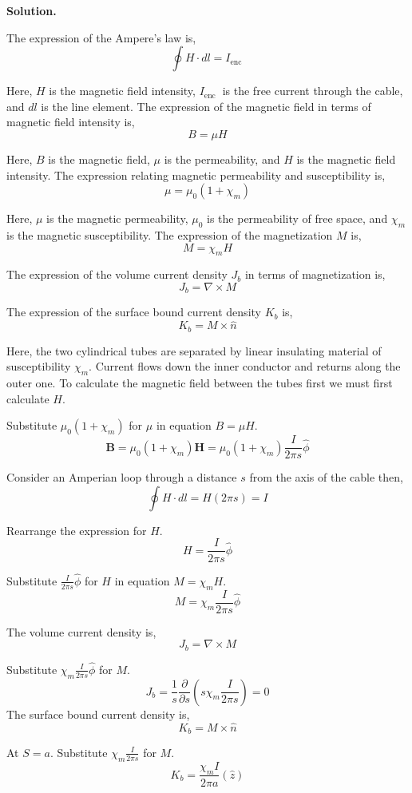 \documentclass[12pt, a4paper, oneside]{report}
\newenvironment{solution}{
  \par\medskip\noindent
  \textbf{Solution.}\quad\itshape
  \par\noindent\makebox[\linewidth]{\rule{\textwidth}{0.4pt}}
}{
  \par\noindent\makebox[\linewidth]{\rule{\textwidth}{0.4pt}}
  \par\medskip
}
\begin{document}
\begin{solution}
The expression of the Ampere's law is,
$$
\oint H \cdot d l=I_{\text {enc }}
$$

Here, $H$ is the magnetic field intensity, $I_{\text {enc }}$ is the free current through the cable, and $d l$ is the line element.
The expression of the magnetic field in terms of magnetic field intensity is,
$$
B=\mu H
$$

Here, $B$ is the magnetic field, $\mu$ is the permeability, and $H$ is the magnetic field intensity.
The expression relating magnetic permeability and susceptibility is,
$$
\mu=\mu_0\left(1+\chi_m\right)
$$

Here, $\mu$ is the magnetic permeability, $\mu_0$ is the permeability of free space, and $\chi_m$ is the magnetic susceptibility.
The expression of the magnetization $M$ is,
$$
M=\chi_m H
$$

The expression of the volume current density $J_b$ in terms of magnetization is,
$$
J_b=\nabla \times M
$$

The expression of the surface bound current density $K_b$ is,
$$
K_b=M \times \hat{n}
$$

Here, the two cylindrical tubes are separated by linear insulating material of susceptibility $\chi_m$. Current flows down the inner conductor and returns along the outer one. To calculate the magnetic field between the tubes first we must first calculate $H$.

Substitute $\mu_0\left(1+\chi_m\right)$ for $\mu$ in equation $B=\mu H$.
$$
\mathbf{B}  =\mu_0\left(1+\chi_m\right) \mathbf{H}  =\mu_0\left(1+\chi_m\right) \frac{I}{2 \pi s} \hat{\phi}
$$

Consider an Amperian loop through a distance $s$ from the axis of the cable then,
$$
\oint H \cdot d l  =H(2 \pi s) =I
$$

Rearrange the expression for $H$.
$$
H=\frac{I}{2 \pi s} \hat{\phi}
$$

Substitute $\frac{I}{2 \pi s} \hat{\phi}$ for $H$ in equation $M=\chi_m H$.
$$
M=\chi_m \frac{I}{2 \pi s} \hat{\phi}
$$

The volume current density is,
$$
J_b=\nabla \times M
$$

Substitute $\chi_m \frac{I}{2 \pi s} \hat{\phi}$ for $M$.
$$
J_b =\frac{1}{s} \frac{\partial}{\partial s}\left(s \chi_m \frac{I}{2 \pi s}\right) =0
$$
The surface bound current density is,
$$
K_b=M \times \hat{n}
$$

At $S=a$.
Substitute $\chi_m \frac{I}{2 \pi s}$ for $M$.
$$
K_b=\frac{\chi_m I}{2 \pi a}(\hat{z})
$$


\end{solution}
\end{document}
